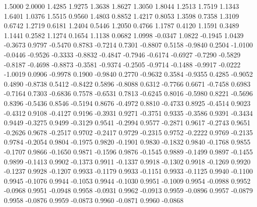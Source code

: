 1.5000    2.0000
    1.4285    1.9275
    1.3638    1.8627
    1.3050    1.8044
    1.2513    1.7519
    1.1343    1.6401
    1.0376    1.5515
    0.9560    1.4803
    0.8852    1.4217
    0.8053    1.3598
    0.7358    1.3109
    0.6742    1.2719
    0.6181    1.2404
    0.5446    1.2050
    0.4766    1.1787
    0.4120    1.1591
    0.3489    1.1441
    0.2582    1.1274
    0.1654    1.1138
    0.0682    1.0998
   -0.0347    1.0822
   -0.1945    1.0439
   -0.3673    0.9797
   -0.5470    0.8783
   -0.7214    0.7301
   -0.8807    0.5158
   -0.9840    0.2504
   -1.0100   -0.0446
   -0.9526   -0.3333
   -0.8832   -0.4847
   -0.7946   -0.6174
   -0.6927   -0.7290
   -0.5829   -0.8187
   -0.4698   -0.8873
   -0.3581   -0.9374
   -0.2505   -0.9714
   -0.1488   -0.9917
   -0.0222   -1.0019
    0.0906   -0.9978
    0.1900   -0.9840
    0.2770   -0.9632
    0.3584   -0.9355
    0.4285   -0.9052
    0.4890   -0.8738
    0.5412   -0.8422
    0.5896   -0.8088
    0.6312   -0.7766
    0.6671   -0.7458
    0.6983   -0.7164
    0.7303   -0.6836
    0.7578   -0.6531
    0.7813   -0.6245
    0.8016   -0.5980
    0.8221   -0.5696
    0.8396   -0.5436
    0.8546   -0.5194
    0.8676   -0.4972
    0.8810   -0.4733
    0.8925   -0.4514
    0.9023   -0.4312
    0.9108   -0.4127
    0.9196   -0.3931
    0.9271   -0.3751
    0.9335   -0.3586
    0.9391   -0.3434
    0.9449   -0.3275
    0.9499   -0.3129
    0.9541   -0.2994
    0.9577   -0.2871
    0.9617   -0.2743
    0.9651   -0.2626
    0.9678   -0.2517
    0.9702   -0.2417
    0.9729   -0.2315
    0.9752   -0.2222
    0.9769   -0.2135
    0.9784   -0.2054
    0.9804   -0.1975
    0.9820   -0.1901
    0.9830   -0.1832
    0.9840   -0.1768
    0.9855   -0.1707
    0.9866   -0.1650
    0.9871   -0.1596
    0.9876   -0.1545
    0.9889   -0.1499
    0.9897   -0.1455
    0.9899   -0.1413
    0.9902   -0.1373
    0.9911   -0.1337
    0.9918   -0.1302
    0.9918   -0.1269
    0.9920   -0.1237
    0.9928   -0.1207
    0.9933   -0.1179
    0.9933   -0.1151
    0.9933   -0.1125
    0.9940   -0.1100
    0.9945   -0.1076
    0.9944   -0.1053
    0.9944   -0.1030
    0.9951   -0.1009
    0.9954   -0.0988
    0.9952   -0.0968
    0.9951   -0.0948
    0.9958   -0.0931
    0.9962   -0.0913
    0.9959   -0.0896
    0.9957   -0.0879
    0.9958   -0.0876
    0.9959   -0.0873
    0.9960   -0.0871
    0.9960   -0.0868